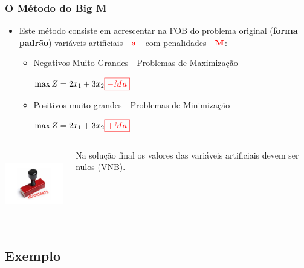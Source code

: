 \begin{frame}
	\frametitle{O Método do Big M}
	\begin{itemize}
	\item[] {Este método consiste em acrescentar na FOB do problema original (\textbf{forma padrão}) variáveis artificiais - $\mathbf{\color{red}a}$ - com penalidades - $\mathbf{\color{red}M}$:} \pause
		\begin{itemize}
		\item {Negativos Muito Grandes - Problemas de Maximização} 
			\begin{mdframed}[backgroundcolor=green!80,rightmargin=4.8cm]
			$
			\max Z = 2x_1 + 3x_2 \color{red}\boxed{-Ma}
			$
			\end{mdframed} \pause
		\item {Positivos muito grandes - Problemas de Minimização}
			\begin{mdframed}[backgroundcolor=green!80,rightmargin=4.8cm]
			$
			\max Z = 2x_1 + 3x_2 \color{red}\boxed{+Ma}
			$
			\end{mdframed} \pause
		\end{itemize}
	\end{itemize}
	\begin{columns}
		\begin{column}{0.3\textwidth}
			\centering
			\includegraphics[width=3cm,height=3cm]{importante.jpg} 
		\end{column}
		\begin{column}{0.7\textwidth}
			Na solução final os valores das variáveis artificiais devem ser nulos (VNB).		
		\end{column}
	\end{columns}
\end{frame}

\subsection{Exemplo}

